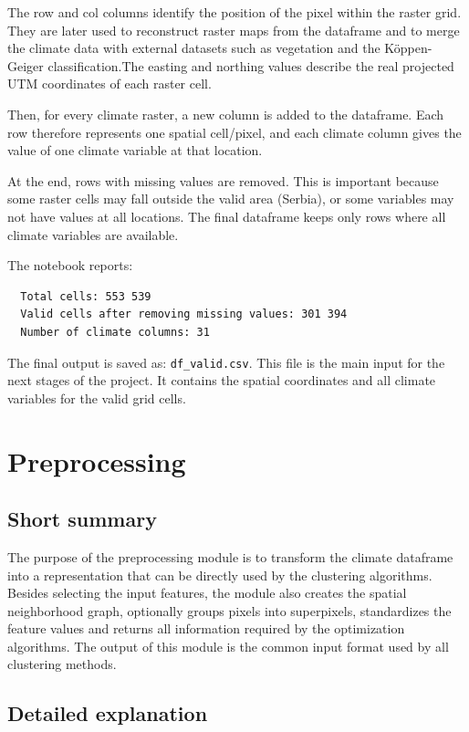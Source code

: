 \documentclass[11pt]{article}
\begin{document}
The row and col columns identify the position of the pixel within the raster grid. They are later used to reconstruct raster maps from the dataframe and to merge the climate data with external datasets such as vegetation and the Köppen-Geiger classification.The easting and northing values describe the real projected UTM coordinates of each raster cell.

Then, for every climate raster, a new column is added to the dataframe. Each row therefore represents one spatial cell/pixel, and each climate column gives the value of one climate variable at that location.

At the end, rows with missing values are removed. This is important because some raster cells may fall outside the valid area (Serbia), or some variables may not have values at all locations. The final dataframe keeps only rows where all climate variables are available.

The notebook reports:
\begin{verbatim}
  Total cells: 553 539
  Valid cells after removing missing values: 301 394
  Number of climate columns: 31
\end{verbatim}

The final output is saved as: \texttt{df\_valid.csv}. This file is the main input for the next stages of the project. It contains the spatial coordinates and all climate variables for the valid grid cells.


\section{Preprocessing}
\label{sec:preprocessing}

\subsection{Short summary} 
The purpose of the preprocessing module is to transform the climate dataframe into a representation that can be directly used by the clustering algorithms. Besides selecting the input features, the module also creates the spatial neighborhood graph, optionally groups pixels into superpixels, standardizes the feature values and returns all information required by the optimization algorithms. The output of this module is the common input format used by all clustering methods.

\subsection{Detailed explanation}
\end{document}
